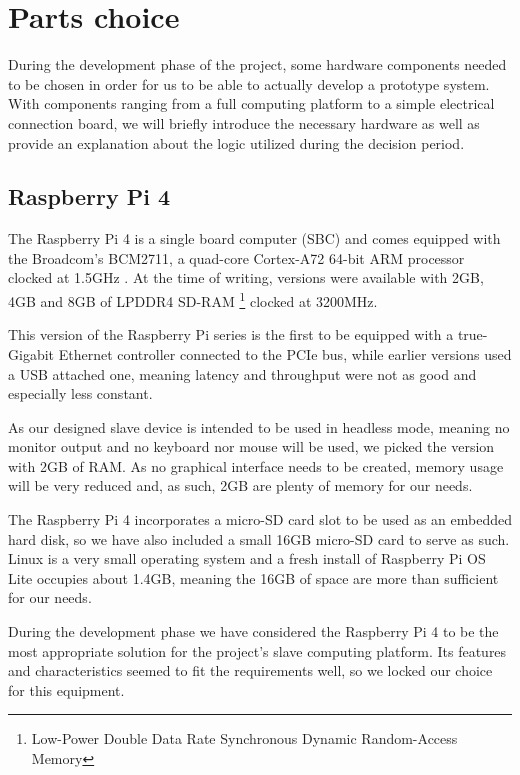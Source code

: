 \section{Parts choice} \label{sec:parts_choice}
During the development phase of the project, some hardware components needed to be chosen in order for us to be able to actually develop a prototype system.
With components ranging from a full computing platform to a simple electrical connection board, we will briefly introduce the necessary hardware as well as provide an explanation about the logic utilized during the decision period.


\subsection{Raspberry Pi 4} \label{subsec:rpi4}
The Raspberry Pi 4 is a single board computer (SBC) and comes equipped with the Broadcom's BCM2711, a quad-core Cortex-A72 64-bit ARM processor clocked at 1.5GHz \cite{technology:rpi4-specs}.
At the time of writing, versions were available with 2GB, 4GB and 8GB of LPDDR4 SD-RAM \footnote{Low-Power Double Data Rate Synchronous Dynamic Random-Access Memory} clocked at 3200MHz.

This version of the Raspberry Pi series is the first to be equipped with a true-Gigabit Ethernet controller connected to the PCIe bus, while earlier versions used a USB attached one, meaning latency and throughput were not as good and especially less constant.

As our designed slave device is intended to be used in headless mode, meaning no monitor output and no keyboard nor mouse will be used, we picked the version with 2GB of RAM.
As no graphical interface needs to be created, memory usage will be very reduced and, as such, 2GB are plenty of memory for our needs.

The Raspberry Pi 4 incorporates a micro-SD card slot to be used as an embedded hard disk, so we have also included a small 16GB micro-SD card to serve as such.
Linux is a very small operating system and a fresh install of Raspberry Pi OS Lite occupies about 1.4GB, meaning the 16GB of space are more than sufficient for our needs.

During the development phase we have considered the Raspberry Pi 4 to be the most appropriate solution for the project's slave computing platform.
Its features and characteristics seemed to fit the requirements well, so we locked our choice for this equipment.

